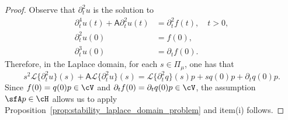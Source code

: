 \begin{proof}
Observe that $\partial^2_t u$ is the solution to
\begin{align}
    \partial^4_t u(t)    +  \mathsf{A}  \partial^2_t  u(t)    &=  \partial^2_t f(t), \quad t>0,   \\
    \partial^2_t u (0) &= f(0),\\
    \partial^3_t  u(0) &= \partial_t f(0).
\end{align}
Therefore, in the Laplace domain, for each $s \in \Pi_\mu$, one has that
\begin{equation}
	s^2 \mathcal{L}\{  \partial^2_t  u \}(s)
	+
	\mathsf{A} \mathcal{L}\{  \partial^2_t  u \}(s)
	=
	\mathcal{L}\{  \partial^2_t  q \}(s) p
	+
	s q(0) p
	+
	\partial_t q(0) p.
\end{equation}
Since $f(0)=q(0)p\in \cV$ and $\partial_t f(0)=\partial_t q(0) p\in\cV$, the assumption $\sfA p\in\cH$ allows us to apply Proposition~\ref{prop:stability_laplace_domain_problem} and item(i) follows.


\end{proof}
